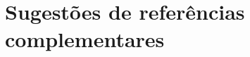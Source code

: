 \documentclass[12pt]{extarticle}
\begin{document}

\section{Sugestões de referências complementares}








\end{document}
